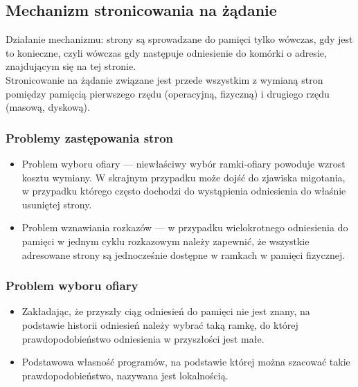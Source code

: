 \documentclass[main.tex]{subfiles}
\begin{document}
    \subsection{Mechanizm stronicowania na żądanie}
    Działanie mechanizmu: strony są sprowadzane do pamięci tylko wówczas, gdy jest to konieczne, czyli wówczas gdy następuje
    odniesienie do komórki o adresie, znajdującym się na tej stronie.
    \\
    Stronicowanie na żądanie związane jest przede wszystkim z wymianą stron pomiędzy pamięcią pierwszego rzędu (operacyjną,
    fizyczną) i drugiego rzędu (masową, dyskową).

    \subsubsection{Problemy zastępowania stron}
    \begin{itemize}
        \item Problem wyboru ofiary — niewłaściwy wybór ramki-ofiary powoduje wzrost kosztu wymiany. W skrajnym przypadku może dojść do zjawiska migotania, w przypadku którego często dochodzi do wystąpienia odniesienia do
        właśnie usuniętej strony.
        \item Problem wznawiania rozkazów — w przypadku wielokrotnego odniesienia do pamięci w jednym cyklu rozkazowym należy
        zapewnić, że wszystkie adresowane strony są jednocześnie dostępne w ramkach w pamięci fizycznej.
    \end{itemize}

    \subsubsection{Problem wyboru ofiary}
    \begin{itemize}
        \item Zakładając, że przyszły ciąg odniesień do pamięci nie jest znany, na podstawie historii odniesień należy wybrać taką ramkę, do której prawdopodobieństwo odniesienia w przyszłości jest małe.
        \item Podstawowa własność programów, na podstawie której można szacować takie prawdopodobieństwo, nazywana jest lokalnością.
    \end{itemize}
\end{document}
